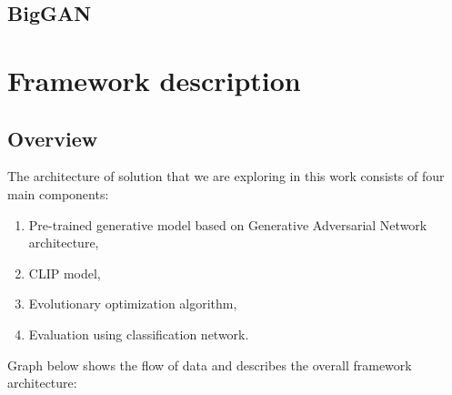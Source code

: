 \documentclass[12pt,a4paper,openany]{book}
\begin{document}



\section{BigGAN}

\chapter{Framework description}

\section{Overview}

\noindent The architecture of solution that we are exploring in this work consists of four main components:
\begin{enumerate}
\item Pre-trained generative model based on Generative Adversarial Network architecture,
\item CLIP model,
\item Evolutionary optimization algorithm,
\item Evaluation using classification network.
\end{enumerate}
Graph below shows the flow of data and describes the overall framework architecture:\\
\end{document}
